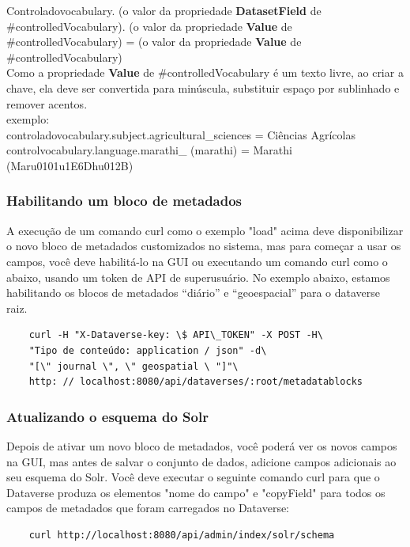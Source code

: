 \documentclass[12pt,hidelinks]{article}
\begin{document}
\qquad Controladovocabulary. (o valor da propriedade \textbf{DatasetField} de \#controlledVocabulary). (o valor da propriedade \textbf{Value} de \#controlledVocabulary) = (o valor da propriedade \textbf{Value} de \#controlledVocabulary)\\

Como a propriedade \textbf{Value} de \#controlledVocabulary é um texto livre, ao criar a chave, ela deve ser convertida para minúscula, substituir espaço por sublinhado e remover acentos.\\

exemplo:\\

controladovocabulary.subject.agricultural\_sciences = Ciências Agrícolas\\

controlvocabulary.language.marathi\_ (marathi) = Marathi (Maru0101u1E6Dhu012B)\\

\subsubsection{Habilitando um bloco de metadados}

\qquad A execução de um comando curl como o exemplo "load" acima deve disponibilizar o novo bloco de metadados customizados no sistema, mas para começar a usar os campos, você deve habilitá-lo na GUI ou executando um comando curl como o abaixo, usando um token de API de superusuário. No exemplo abaixo, estamos habilitando os blocos de metadados “diário” e “geoespacial” para o dataverse raiz.

\begin{verbatim}
    curl -H "X-Dataverse-key: \$ API\_TOKEN" -X POST -H\
    "Tipo de conteúdo: application / json" -d\ 
    "[\" journal \", \" geospatial \ "]"\
    http: // localhost:8080/api/dataverses/:root/metadatablocks
\end{verbatim}

\subsubsection{Atualizando o esquema do Solr}

\qquad Depois de ativar um novo bloco de metadados, você poderá ver os novos campos na GUI, mas antes de salvar o conjunto de dados, adicione campos adicionais ao seu esquema do Solr. Você deve executar o seguinte comando curl para que o Dataverse produza os elementos "nome do campo" e "copyField" para todos os campos de metadados que foram carregados no Dataverse:\\
\begin{verbatim}
    curl http://localhost:8080/api/admin/index/solr/schema
\end{verbatim}
\end{document}
